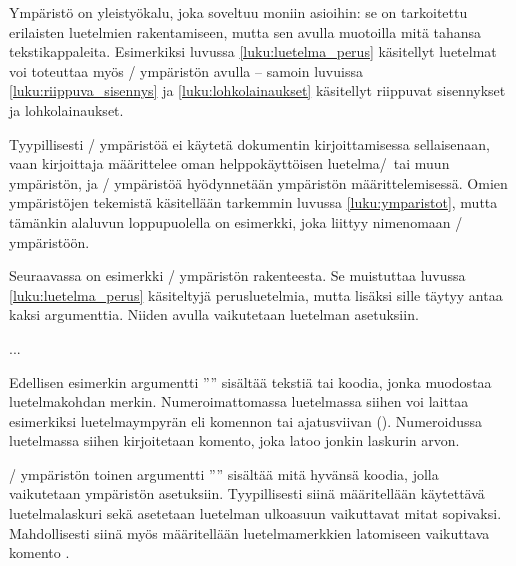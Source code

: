 Ympäristö  on yleistyökalu, joka soveltuu moniin
asioihin: se on tarkoitettu erilaisten luetelmien rakentamiseen, mutta
sen avulla muotoilla mitä tahansa tekstikappaleita. Esimerkiksi luvussa
\ref{luku:luetelma_perus} käsitellyt luetelmat voi toteuttaa myös
\-/ ympäristön avulla -- samoin luvuissa
\ref{luku:riippuva_sisennys} ja \ref{luku:lohkolainaukset} käsitellyt
riippuvat sisennykset ja lohkolainaukset.

Tyypillisesti \-/ ympäristöä ei käytetä dokumentin
kirjoittamisessa sellaisenaan, vaan kirjoittaja määrittelee oman
helppokäyttöisen luetelma\-/\ tai muun ympäristön, ja
\-/ ympäristöä hyödynnetään ympäristön
määrittelemisessä. Omien ympäristöjen tekemistä käsitellään tarkemmin
luvussa \ref{luku:ymparistot}, mutta tämänkin alaluvun loppupuolella on
esimerkki, joka liittyy nimenomaan \-/ ympäristöön.

Seuraavassa on esimerkki \-/ ympäristön rakenteesta. Se
muistuttaa luvussa \ref{luku:luetelma_perus} käsiteltyjä perusluetelmia,
mutta lisäksi sille täytyy antaa kaksi argumenttia. Niiden avulla
vaikutetaan luetelman asetuksiin.

\begin{koodilohkosis}
  \begin{list}{merkki}{asetukset}
  \item ...
  \end{list}
\end{koodilohkosis}

Edellisen esimerkin argumentti '''' sisältää tekstiä tai
koodia, jonka muodostaa luetelmakohdan merkin. Numeroimattomassa
luetelmassa siihen voi laittaa esimerkiksi luetelmaympyrän eli komennon
 tai ajatusviivan (\koodi{--}). Numeroidussa
luetelmassa siihen kirjoitetaan komento, joka latoo jonkin laskurin
arvon.

\-/ ympäristön toinen argumentti
'''' sisältää mitä hyvänsä koodia, jolla
vaikutetaan ympäristön asetuksiin. Tyypillisesti siinä määritellään
käytettävä luetelmalaskuri sekä asetetaan luetelman ulkoasuun
vaikuttavat mitat sopivaksi. Mahdollisesti siinä myös määritellään
luetelmamerkkien latomiseen vaikuttava komento .

